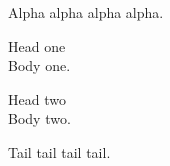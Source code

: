 \documentclass[11pt]{article}
\begin{document}
Alpha alpha alpha alpha.

Head one\\[-6pt]
Body one.

Head two\\[-6pt]
Body two.

Tail tail tail tail.
\end{document}
